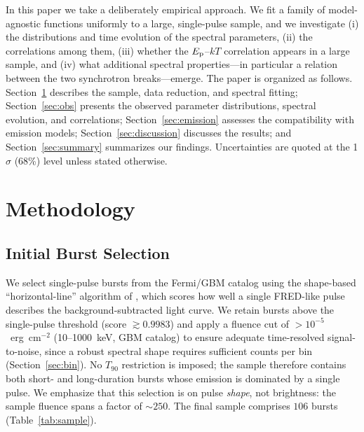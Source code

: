 \documentclass[twocolumn]{aastex631}
\newcommand{\Ep}{\ensuremath{E_{\rm p}}}
\newcommand{\kT}{\ensuremath{kT}}
\begin{document}
In this paper we take a deliberately empirical approach. We fit a family of
model-agnostic functions uniformly to a large, single-pulse sample, and we
investigate (i) the distributions and time evolution of the spectral parameters,
(ii) the correlations among them, (iii) whether the \citet{Burgess2014a}
$\Ep$--$\kT$ correlation appears in a large sample, and (iv) what additional
spectral properties---in particular a relation between the two synchrotron
breaks---emerge. The paper is organized as follows. Section~\ref{sec:method}
describes the sample, data reduction, and spectral fitting; Section~\ref{sec:obs}
presents the observed parameter distributions, spectral evolution, and
correlations; Section~\ref{sec:emission} assesses the compatibility with emission
models; Section~\ref{sec:discussion} discusses the results; and
Section~\ref{sec:summary} summarizes our findings. Uncertainties are quoted at the
1$\sigma$ (68\%) level unless stated otherwise.

\section{Methodology} \label{sec:method}
\subsection{Initial Burst Selection} \label{sec:sel}
We select single-pulse bursts from the Fermi/GBM catalog
\citep{Meegan2009,Gruber2014} using the shape-based ``horizontal-line'' algorithm
of \citet{Busby2024}, which scores how well a single FRED-like pulse describes the
background-subtracted light curve. We retain bursts above the \citeauthor{Busby2024}
single-pulse threshold (score $\gtrsim0.9983$) and apply a fluence cut of
$>$$10^{-5}$~erg~cm$^{-2}$ (10--1000~keV, GBM catalog) to ensure adequate
time-resolved signal-to-noise, since a robust spectral shape requires
sufficient counts per bin (Section~\ref{sec:bin}). No $T_{90}$ restriction is
imposed; the sample therefore contains both short- and long-duration bursts whose
emission is dominated by a single pulse. We emphasize that this selection is on
pulse \emph{shape}, not brightness: the sample fluence spans a factor of
$\sim$$250$. The final sample comprises \textbf{$106$} bursts
(Table~\ref{tab:sample}).
\end{document}
